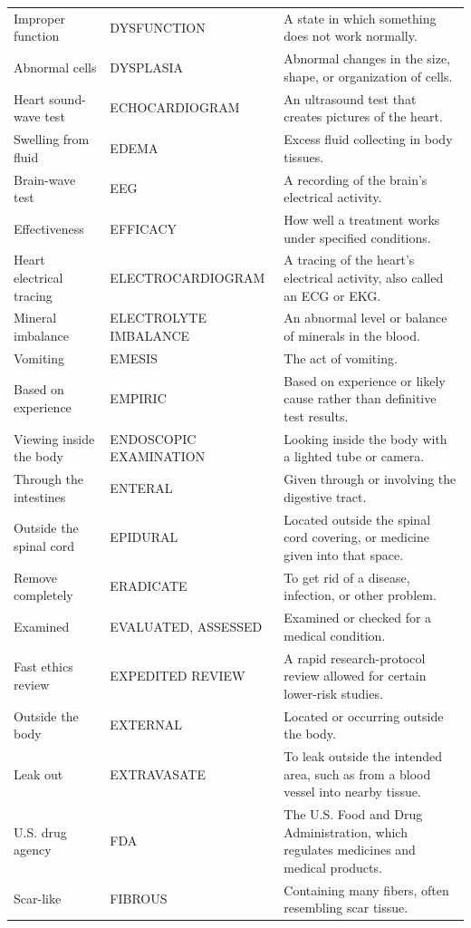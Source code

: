\begin{longtable}{>{\raggedright\arraybackslash}p{} >{\raggedright\arraybackslash}p{} >{\raggedright\arraybackslash}p{}}
Improper function & DYSFUNCTION & A state in which something does not work normally. \\
Abnormal cells & DYSPLASIA & Abnormal changes in the size, shape, or organization of cells. \\
Heart sound-wave test & ECHOCARDIOGRAM & An ultrasound test that creates pictures of the heart. \\
Swelling from fluid & EDEMA & Excess fluid collecting in body tissues. \\
Brain-wave test & EEG & A recording of the brain's electrical activity. \\
Effectiveness & EFFICACY & How well a treatment works under specified conditions. \\
Heart electrical tracing & ELECTROCARDIOGRAM & A tracing of the heart's electrical activity, also called an ECG or EKG. \\
Mineral imbalance & ELECTROLYTE IMBALANCE & An abnormal level or balance of minerals in the blood. \\
Vomiting & EMESIS & The act of vomiting. \\
Based on experience & EMPIRIC & Based on experience or likely cause rather than definitive test results. \\
Viewing inside the body & ENDOSCOPIC EXAMINATION & Looking inside the body with a lighted tube or camera. \\
Through the intestines & ENTERAL & Given through or involving the digestive tract. \\
Outside the spinal cord & EPIDURAL & Located outside the spinal cord covering, or medicine given into that space. \\
Remove completely & ERADICATE & To get rid of a disease, infection, or other problem. \\
Examined & EVALUATED, ASSESSED & Examined or checked for a medical condition. \\
Fast ethics review & EXPEDITED REVIEW & A rapid research-protocol review allowed for certain lower-risk studies. \\
Outside the body & EXTERNAL & Located or occurring outside the body. \\
Leak out & EXTRAVASATE & To leak outside the intended area, such as from a blood vessel into nearby tissue. \\
U.S. drug agency & FDA & The U.S. Food and Drug Administration, which regulates medicines and medical products. \\
Scar-like & FIBROUS & Containing many fibers, often resembling scar tissue. \\

\end{longtable}
